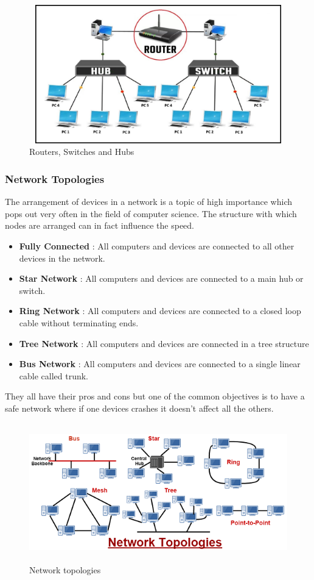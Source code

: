 \documentclass{article}
\begin{document}
\begin{figure}[h]    
    \centering
    \includegraphics[width=13cm, height=6cm,center]{images/ethernet-hardware}
    \caption{Routers, Switches and Hubs}
\end{figure}
\subsubsection{Network Topologies}
The arrangement of devices in a network is a topic of high importance which pops out very often in the field of computer science.  The structure with which nodes are arranged can in fact influence the speed.
\begin{itemize}
\item \textbf{Fully Connected} : All computers and devices are connected to all other devices in the network.
\item \textbf{Star Network}   : All computers and devices are connected to a main hub or switch.
\item \textbf{Ring Network} : All computers and devices are connected to a closed loop cable without terminating ends. 
\item \textbf{Tree Network}  : All computers and devices are connected in a tree structure
\item \textbf{Bus Network}   : All computers and devices are connected to a single linear cable called trunk.
\end{itemize}

They all have their pros and cons but one of the common objectives is to have a safe network where if one devices crashes it doesn't affect all the others.
\begin{figure}[h]    
    \centering
    \includegraphics[width=13cm, height=6cm,center]{images/network-topologies}
    \caption{Network topologies}
\end{figure}
\end{document}
